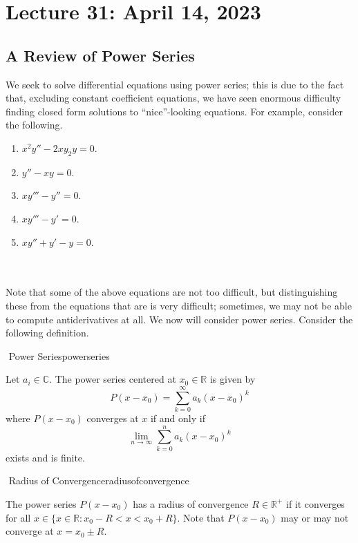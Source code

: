 \section{Lecture 31: April 14, 2023}

    \subsection{A Review of Power Series}

        We seek to solve differential equations using power series; this is due to the fact that, excluding constant coefficient equations, we have seen enormous difficulty finding closed form solutions to ``nice''-looking equations. For example,
        consider the following.
        \begin{enumerate}
            \item \(x^2y''-2xy_2y=0\).
            \item \(y''-xy=0\).
            \item \(xy'''-y''=0\).
            \item \(xy'''-y'=0\).
            \item \(xy''+y'-y=0\).
        \end{enumerate}
        \pagebreak
        \vphantom
        \\
        \\
        Note that some of the above equations are not too difficult, but distinguishing these from the equations that are is very difficult; sometimes, we may not be able to compute antiderivatives at all. We now will consider power series. Consider the following definition.
        \begin{definition}{\Stop\,\,Power Series}{powerseries}

            Let \(a_i\in\mathbb{C}\). The power series centered at \(x_0\in\mathbb{R}\) is given by
            \begin{equation*}
                P(x-x_0)=\sum_{k=0}^\infty a_k(x-x_0)^k
            \end{equation*}
            where \(P(x-x_0)\) converges at \(x\) if and only if
            \begin{equation*}
                \lim_{n\to\infty}\sum_{k=0}^n a_k(x-x_0)^k
            \end{equation*}
            exists and is finite.

        \end{definition}
        \begin{definition}{\Stop\,\,Radius of Convergence}{radiusofconvergence}

            The power series \(P(x-x_0)\) has a radius of convergence \(R\in\mathbb{R}^+\) if it converges for all \(x\in\{x\in\mathbb{R}:x_0-R<x<x_0+R\}\). Note that \(P(x-x_0)\) may or may not converge at \(x=x_0\pm R\).

        \end{definition}
